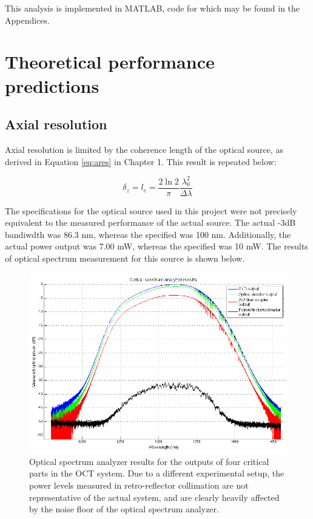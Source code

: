This analysis is implemented in MATLAB, code for which may be found in the Appendices.

\section{Theoretical performance predictions}
\label{sec:theory_res}

\subsection{Axial resolution}
\label{sec:axial_res}

Axial resolution is limited by the coherence length of the optical source, as derived in Equation \ref{eq:ares} in Chapter 1. This result is repeated below:

\begin{equation} \label{eq:ares2}
\delta_z = l_c = \frac{2 \ln{2}}{\pi} \frac{\lambda_0^2}{\Delta \lambda}
\end{equation}

The specifications for the optical source used in this project were not precisely equivalent to the measured performance of the actual source. The actual -3dB bandiwdth was 86.3 nm, whereas the specified was 100 nm. Additionally, the actual power output was 7.00 mW, whereas the specified was 10 mW. The results of optical spectrum measurement for this source is shown below.

\begin{figure}[h!]
\centering
\includegraphics[width=1.0\textwidth]{Images/System/osa.png}
\caption{Optical spectrum analyzer results for the outputs of four critical parts in the OCT system. Due to a different experimental setup, the power levels measured in retro-reflector collimation are not representative of the actual system, and are clearly heavily affected by the noise floor of the optical spectrum analyzer. \label{fig:osa}}
\end{figure}

